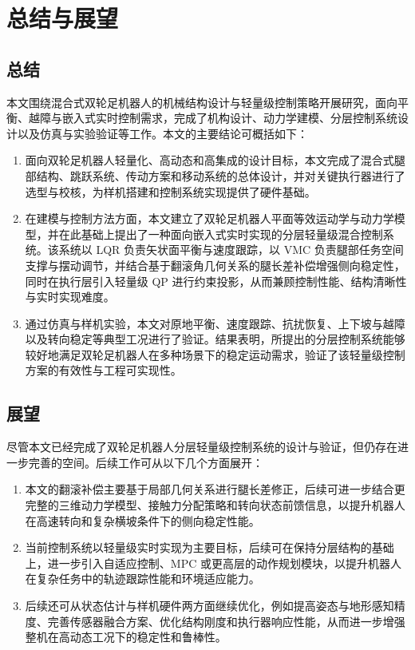 \chapter{总结与展望}\label{chap:conclusion}

\section{总结}

本文围绕混合式双轮足机器人的机械结构设计与轻量级控制策略开展研究，面向平衡、越障与嵌入式实时控制需求，完成了机构设计、动力学建模、分层控制系统设计以及仿真与实验验证等工作。本文的主要结论可概括如下：

\begin{enumerate}
    \item 面向双轮足机器人轻量化、高动态和高集成的设计目标，本文完成了混合式腿部结构、跳跃系统、传动方案和移动系统的总体设计，并对关键执行器进行了选型与校核，为样机搭建和控制系统实现提供了硬件基础。
    \item 在建模与控制方法方面，本文建立了双轮足机器人平面等效运动学与动力学模型，并在此基础上提出了一种面向嵌入式实时实现的分层轻量级混合控制系统。该系统以 LQR 负责矢状面平衡与速度跟踪，以 VMC 负责腿部任务空间支撑与摆动调节，并结合基于翻滚角几何关系的腿长差补偿增强侧向稳定性，同时在执行层引入轻量级 QP 进行约束投影，从而兼顾控制性能、结构清晰性与实时实现难度。
    \item 通过仿真与样机实验，本文对原地平衡、速度跟踪、抗扰恢复、上下坡与越障以及转向稳定等典型工况进行了验证。结果表明，所提出的分层控制系统能够较好地满足双轮足机器人在多种场景下的稳定运动需求，验证了该轻量级控制方案的有效性与工程可实现性。
\end{enumerate}

\section{展望}

尽管本文已经完成了双轮足机器人分层轻量级控制系统的设计与验证，但仍存在进一步完善的空间。后续工作可从以下几个方面展开：

\begin{enumerate}
    \item 本文的翻滚补偿主要基于局部几何关系进行腿长差修正，后续可进一步结合更完整的三维动力学模型、接触力分配策略和转向状态前馈信息，以提升机器人在高速转向和复杂横坡条件下的侧向稳定性能。
    \item 当前控制系统以轻量级实时实现为主要目标，后续可在保持分层结构的基础上，进一步引入自适应控制、MPC 或更高层的动作规划模块，以提升机器人在复杂任务中的轨迹跟踪性能和环境适应能力。
    \item 后续还可从状态估计与样机硬件两方面继续优化，例如提高姿态与地形感知精度、完善传感器融合方案、优化结构刚度和执行器响应性能，从而进一步增强整机在高动态工况下的稳定性和鲁棒性。
\end{enumerate}
